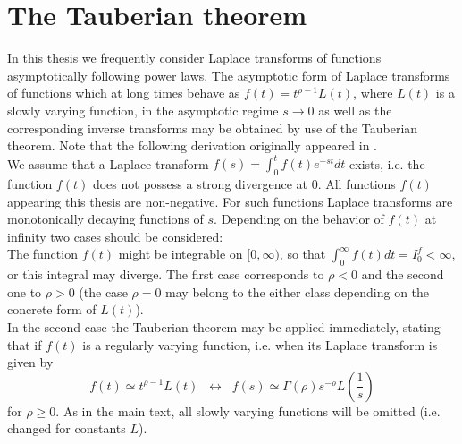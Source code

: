 \chapter{The Tauberian theorem} \label{sec:tauberian}

In this thesis we frequently consider Laplace transforms of functions asymptotically following power laws. The asymptotic form of Laplace transforms of functions which at long times behave as $f(t) = t^{\rho-1} L(t)$, where $L(t)$ is a slowly varying function, in the asymptotic regime $s \to 0$ as well as the corresponding inverse transforms may be obtained by use of the Tauberian theorem. Note that the following derivation originally appeared in \cite{bothe}.\\

We assume that a Laplace transform $f(s) = \int_0^t f(t) e^{-st} dt$ exists, i.e. the function $f(t)$ does not possess a strong divergence at 0. All functions $f(t)$ appearing this thesis are non-negative. For such functions Laplace transforms are monotonically decaying functions of $s$. Depending on the behavior of $f(t)$ at infinity two cases should be considered: \\
The function $f(t)$ might be integrable on $[0, \infty)$, so that 
$\int_0^\infty f(t) dt = I_0^{f} < \infty$, or this integral may diverge. The first case corresponds to $\rho < 0$ and 
the second one to $\rho > 0$ (the case $\rho = 0$ may belong to the either class depending on the concrete form of $L(t)$). \\
In the second case the Tauberian theorem may be applied immediately, stating that if $f(t)$ is a regularly varying function, i.e. when  its Laplace transform is given by 
\begin{equation}
 f(t) \simeq t^{\rho-1} L(t) \;\; \leftrightarrow \;\; f(s) \simeq \Gamma(\rho) s^{-\rho} L\left(\frac{1}{s}\right)
 \label{eq:Tauberian}
\end{equation}
for $\rho \geq 0$. As in the main text, all slowly varying functions will be omitted (i.e. changed for constants $L$). 

